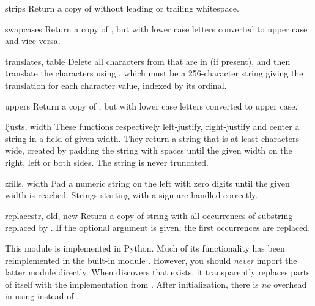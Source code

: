\begin{funcdesc}{strip}{s}
  Return a copy of  without leading or trailing whitespace.
\end{funcdesc}

\begin{funcdesc}{swapcase}{s}
  Return a copy of , but with lower case letters
  converted to upper case and vice versa.
\end{funcdesc}

\begin{funcdesc}{translate}{s, table}
  Delete all characters from  that are in  (if 
  present), and then translate the characters using , which 
  must be a 256-character string giving the translation for each
  character value, indexed by its ordinal.  
\end{funcdesc}

\begin{funcdesc}{upper}{s}
  Return a copy of , but with lower case letters converted to
  upper case.
\end{funcdesc}

\begin{funcdesc}{ljust}{s, width}
  These functions respectively left-justify, right-justify and center
  a string in a field of given width.  They return a string that is at
  least  characters wide, created by padding the string
   with spaces until the given width on the right, left or both
  sides.  The string is never truncated.
\end{funcdesc}

\begin{funcdesc}{zfill}{s, width}
  Pad a numeric string on the left with zero digits until the given
  width is reached.  Strings starting with a sign are handled
  correctly.
\end{funcdesc}

\begin{funcdesc}{replace}{str, old, new}
  Return a copy of string  with all occurrences of substring
   replaced by .  If the optional argument
   is given, the first  occurrences are
  replaced.
\end{funcdesc}

This module is implemented in Python.  Much of its functionality has
been reimplemented in the built-in module
.  However, you
should \emph{never} import the latter module directly.  When
 discovers that  exists, it transparently
replaces parts of itself with the implementation from .
After initialization, there is \emph{no} overhead in using
 instead of .
